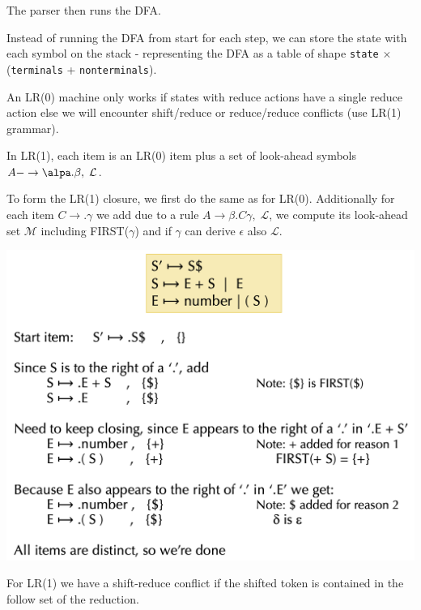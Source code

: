 The parser then runs the DFA.\medskip

Instead of running the DFA from start for each step, we can store the state with each symbol on the stack - representing the DFA as a table of shape \texttt{state} $\times$ (\texttt{terminals} + \texttt{nonterminals}). \medskip

An LR(0) machine only works if states with reduce actions have a single reduce action else we will encounter shift/reduce or reduce/reduce conflicts (use LR(1) grammar). \medskip

In LR(1), each item is an LR(0) item plus a set of look-ahead symbols $A -\to \alpa . \beta, \; \mathcal L$. \medskip

To form the LR(1) closure, we first do the same as for LR(0). Additionally for each item $C \to .\gamma$ we add due to a rule $A \to \beta . C \gamma, \; \mathcal L$, we compute its look-ahead set $\mathcal M$ including FIRST($\gamma$) and if $\gamma$ can derive $\epsilon$ also $\mathcal L$. \medskip

\begin{center}
	\includegraphics[width=\linewidth]{assets/lr1.png}
\end{center}
		
For LR(1) we have a shift-reduce conflict if the shifted token is contained in the follow set of the reduction.





